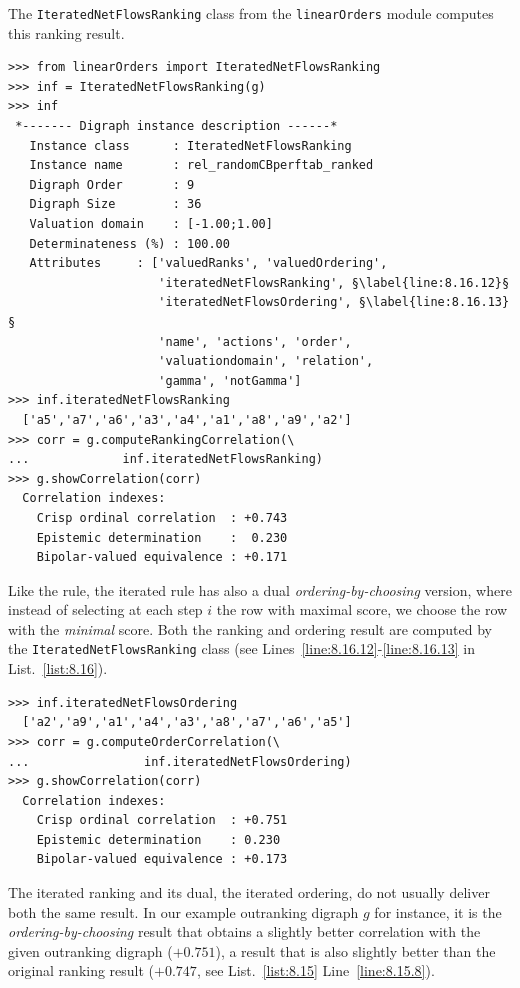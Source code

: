 The \texttt{IteratedNetFlowsRanking} class from the \texttt{linearOrders} module computes this ranking result. 
\begin{lstlisting}[caption={Ranking-by-choosing with iterated maximal \NetFlows scores},label=list:8.16]   
>>> from linearOrders import IteratedNetFlowsRanking  
>>> inf = IteratedNetFlowsRanking(g)
>>> inf
 *------- Digraph instance description ------*
   Instance class      : IteratedNetFlowsRanking
   Instance name       : rel_randomCBperftab_ranked
   Digraph Order       : 9
   Digraph Size        : 36
   Valuation domain    : [-1.00;1.00]
   Determinateness (%) : 100.00
   Attributes     : ['valuedRanks', 'valuedOrdering',
                     'iteratedNetFlowsRanking', §\label{line:8.16.12}§
                     'iteratedNetFlowsOrdering', §\label{line:8.16.13}§
                     'name', 'actions', 'order',
                     'valuationdomain', 'relation',
                     'gamma', 'notGamma']
>>> inf.iteratedNetFlowsRanking
  ['a5','a7','a6','a3','a4','a1','a8','a9','a2']
>>> corr = g.computeRankingCorrelation(\
...             inf.iteratedNetFlowsRanking)
>>> g.showCorrelation(corr)
  Correlation indexes:
    Crisp ordinal correlation  : +0.743
    Epistemic determination    :  0.230
    Bipolar-valued equivalence : +0.171
\end{lstlisting}

Like the \Kohler rule, the iterated \NetFlows rule has also a dual \emph{ordering-by-choosing} version, where instead of selecting at each step $i$ the row with maximal \NetFlows score, we choose the row with the \emph{minimal} \NetFlows score. Both the ranking and ordering result are computed by the \texttt{IteratedNetFlowsRanking} class (see Lines~\vref{line:8.16.12}-\vref{line:8.16.13} in List.~\vref{list:8.16}).
\begin{lstlisting}
>>> inf.iteratedNetFlowsOrdering
  ['a2','a9','a1','a4','a3','a8','a7','a6','a5']
>>> corr = g.computeOrderCorrelation(\
...                inf.iteratedNetFlowsOrdering)
>>> g.showCorrelation(corr)
  Correlation indexes:
    Crisp ordinal correlation  : +0.751
    Epistemic determination    : 0.230
    Bipolar-valued equivalence : +0.173
\end{lstlisting}

The iterated \NetFlows ranking and its dual, the iterated \NetFlows ordering, do not usually deliver both the same result. In our example outranking digraph $g$ for instance, it is the \emph{ordering-by-choosing} result that obtains a slightly better correlation with the given outranking digraph ($+0.751$), a result that is also slightly better than the original \Kohler ranking result ($+0.747$, see List.~\vref{list:8.15} Line~\vref{line:8.15.8}).

